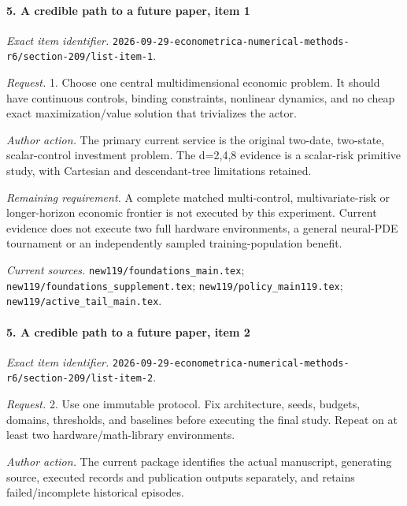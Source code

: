 \paragraph{5. A credible path to a future paper, item 1}

\emph{Exact item identifier.} \nolinkurl{2026-09-29-econometrica-numerical-methods-r6/section-209/list-item-1}.

\par\emph{Request.} 1. Choose one central multidimensional economic problem. It should have continuous controls, binding constraints, nonlinear dynamics, and no cheap exact maximization/\allowbreak{}value solution that trivializes the actor.

\par\emph{Author action.} The primary current service is the original two-date, two-state, scalar-control investment problem. The d=2,4,8 evidence is a scalar-risk primitive study, with Cartesian and descendant-tree limitations retained.

\par\emph{Remaining requirement.} A complete matched multi-control, multivariate-risk or longer-horizon economic frontier is not executed by this experiment. Current evidence does not execute two full hardware environments, a general neural-PDE tournament or an independently sampled training-population benefit.

\par\emph{Current sources.} \nolinkurl{new119/foundations_main.tex}; \nolinkurl{new119/foundations_supplement.tex}; \nolinkurl{new119/policy_main119.tex}; \nolinkurl{new119/active_tail_main.tex}.

\paragraph{5. A credible path to a future paper, item 2}

\emph{Exact item identifier.} \nolinkurl{2026-09-29-econometrica-numerical-methods-r6/section-209/list-item-2}.

\par\emph{Request.} 2. Use one immutable protocol. Fix architecture, seeds, budgets, domains, thresholds, and baselines before executing the final study. Repeat on at least two hardware/\allowbreak{}math-library environments.

\par\emph{Author action.} The current package identifies the actual manuscript, generating source, executed records and publication outputs separately, and retains failed/\allowbreak{}incomplete historical episodes.

